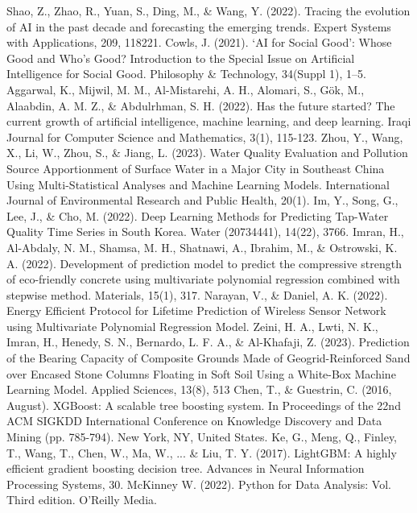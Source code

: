 \documentclass[12pt,a4paper]{article}
\begin{document}
\begin{enumerate}
\begin{thebibliography}{99}
 Shao, Z., Zhao, R., Yuan, S., Ding, M., \& Wang, Y. (2022). Tracing the evolution of AI in the past decade and forecasting the emerging trends. Expert Systems with Applications, 209, 118221.
 Cowls, J. (2021). ‘AI for Social Good’: Whose Good and Who’s Good? Introduction to the Special Issue on Artificial Intelligence for Social Good. Philosophy \& Technology, 34(Suppl 1), 1–5.
 Aggarwal, K., Mijwil, M. M., Al-Mistarehi, A. H., Alomari, S., Gök, M., Alaabdin, A. M. Z., \& Abdulrhman, S. H. (2022). Has the future started? The current growth of artificial intelligence, machine learning, and deep learning. Iraqi Journal for Computer Science and Mathematics, 3(1), 115-123.
 Zhou, Y., Wang, X., Li, W., Zhou, S., \& Jiang, L. (2023). Water Quality Evaluation and Pollution Source Apportionment of Surface Water in a Major City in Southeast China Using Multi-Statistical Analyses and Machine Learning Models. International Journal of Environmental Research and Public Health, 20(1).
 Im, Y., Song, G., Lee, J., \& Cho, M. (2022). Deep Learning Methods for Predicting Tap-Water Quality Time Series in South Korea. Water (20734441), 14(22), 3766.
 Imran, H., Al-Abdaly, N. M., Shamsa, M. H., Shatnawi, A., Ibrahim, M., \& Ostrowski, K. A. (2022). Development of prediction model to predict the compressive strength of eco-friendly concrete using multivariate polynomial regression combined with stepwise method. Materials, 15(1), 317.
 Narayan, V., \& Daniel, A. K. (2022). Energy Efficient Protocol for Lifetime Prediction of Wireless Sensor Network using Multivariate Polynomial Regression Model.
 Zeini, H. A., Lwti, N. K., Imran, H., Henedy, S. N., Bernardo, L. F. A., \& Al-Khafaji, Z. (2023). Prediction of the Bearing Capacity of Composite Grounds Made of Geogrid-Reinforced Sand over Encased Stone Columns Floating in Soft Soil Using a White-Box Machine Learning Model. Applied Sciences, 13(8), 513
 Chen, T., \& Guestrin, C. (2016, August). XGBoost: A scalable tree boosting system. In Proceedings of the 22nd ACM SIGKDD International Conference on Knowledge Discovery and Data Mining (pp. 785-794). New York, NY, United States.
 Ke, G., Meng, Q., Finley, T., Wang, T., Chen, W., Ma, W., ... \& Liu, T. Y. (2017). LightGBM: A highly efficient gradient boosting decision tree. Advances in Neural Information Processing Systems, 30.
 McKinney W. (2022). Python for Data Analysis: Vol. Third edition. O’Reilly Media.

\end{thebibliography}
\end{enumerate}
\end{document}
